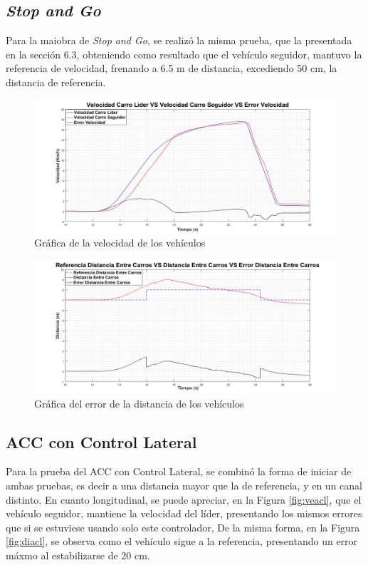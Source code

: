 \subsection{\textit{Stop and Go}}
Para la maiobra de \textit{Stop and Go}, se realizó la misma prueba, que la presentada en la sección 6.3, obteniendo como resultado que el vehículo seguidor, mantuvo la referencia de velocidad, frenando a 6.5 m de distancia, excediendo 50 cm, la distancia de referencia.\\
\begin{figure}[H]
	\centering
		\includegraphics[scale=0.35]{Imagenes/velstg1}
		\caption{Gráfica de la velocidad de los vehículos}
		\label{fig:velstg1}
\end{figure}	

\begin{figure}[H]
	\centering
		\includegraphics[scale=0.35]{Imagenes/diststg1}
		\caption{Gráfica del error de la distancia de los vehículos}
		\label{fig:diststg1}
\end{figure}	

\subsection{ACC con Control Lateral}

Para la prueba del ACC con Control Lateral, se combinó la forma de iniciar de ambas pruebas, es decir a una distancia mayor que la de referencia, y en un canal distinto. En cuanto longitudinal, se puede apreciar, en la Figura \ref{fig:veacl}, que el vehículo seguidor, mantiene la velocidad del líder, presentando los mismos errores que si se estuviese usando solo este controlador, De la misma forma, en la Figura \ref{fig:diacl}, se observa como el vehículo sigue a la referencia, presentando un error máxmo al estabilizarse de 20 cm.\\   


